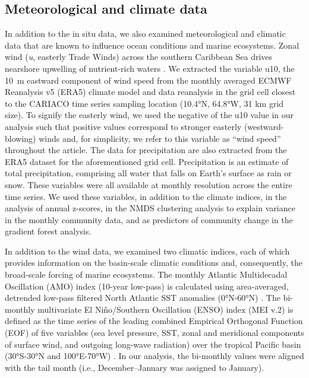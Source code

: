 \documentclass[]{agujournal2019}
\begin{document}
\subsection{Meteorological and climate data}
     In addition to the in situ data, we also examined meteorological and climatic data that are known to influence ocean conditions and marine ecosystems. Zonal wind (\textit{u}, easterly Trade Winds) across the southern Caribbean Sea drives nearshore upwelling of nutrient-rich waters \cite{rueda-roa_southern_2013}. We extracted the variable u10, the \qty{10}{\meter} eastward component of wind speed from the monthly averaged ECMWF Reanalysis v5 (ERA5) climate model and data reanalysis \cite{hersbach_era5_2023} in the grid cell closest to the CARIACO time series sampling location (\ang{10.4}N, \ang{64.8}W, 31 km grid size).  To signify the easterly wind, we used the negative of the u10 value in our analysis such that positive values correspond to stronger easterly (westward-blowing) winds and, for simplicity, we refer to this variable as ``wind speed'' throughout the article. The data for precipitation are also extracted from the ERA5 dataset for the aforementioned grid cell. Precipitation is an estimate of total precipitation, comprising all water that falls on Earth's surface as rain or snow. These variables were all available at monthly resolution across the entire time series. We used these variables, in addition to the climate indices, in the analysis of annual z-scores, in the NMDS clustering analysis to explain variance in the monthly community data, and as predictors of community change in the gradient forest analysis.
    
    In addition to the wind data, we examined two climatic indices, each of which provides information on the basin-scale climatic conditions and, consequently, the broad-scale forcing of marine ecosystems. The monthly Atlantic Multidecadal Oscillation (AMO) index (10-year low-pass) is calculated using area-averaged, detrended low-pass filtered North Atlantic SST anomalies (\ang{0}N-\ang{60}N) \cite{trenberth_climate_2023}. 
    The bi-monthly multivariate El Niño/Southern Oscillation (ENSO) index (MEI v.2) is defined as the time series of the leading combined Empirical Orthogonal Function (EOF) of five variables (sea level pressure, SST, zonal and meridional components of surface wind, and outgoing long-wave radiation) over the tropical Pacific basin (\ang{30}S-\ang{30}N and \ang{100}E-\ang{70}W) \cite{noaa_physical_sciences_laboratory_multivariate_2025}. In our analysis, the bi-monthly values were aligned with the tail month (i.e., December–January was assigned to January).
\end{document}
